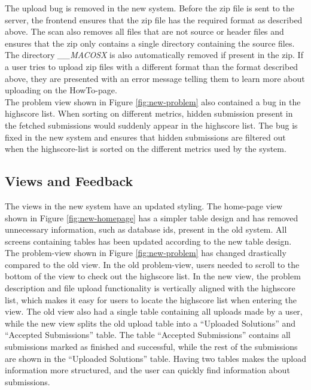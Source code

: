 The upload bug is removed in the new system. Before the zip file is sent to the server, the frontend ensures that the zip file has the required format as described above. The scan also removes all files that are not source or header files and ensures that the zip only contains a single directory containing the source files. The directory \textit{\_\_MACOSX} is also automatically removed if present in the zip. If a user tries to upload zip files with a different format than the format described above, they are presented with an error message telling them to learn more about uploading on the HowTo-page. \\

The problem view shown in Figure \ref{fig:new-problem} also contained a bug in the highscore list. When sorting on different metrics, hidden submission present in the fetched submissions would suddenly appear in the highscore list. The bug is fixed in the new system and ensures that hidden submissions are filtered out when the highscore-list is sorted on the different metrics used by the system.

\subsection{Views and Feedback}
The views in the new system have an updated styling. The home-page view shown in Figure \ref{fig:new-homepage} has a simpler table design and has removed unnecessary information, such as database ids, present in the old system. All screens containing tables has been updated according to the new table design. The problem-view shown in Figure \ref{fig:new-problem} has changed drastically compared to the old view. In the old problem-view, users needed to scroll to the bottom of the view to check out the highscore list. In the new view, the problem description and file upload functionality is vertically aligned with the highscore list, which makes it easy for users to locate the highscore list when entering the view. The old view also had a single table containing all uploads made by a user, while the new view splits the old upload table into a “Uploaded Solutions” and “Accepted Submissions” table. The table “Accepted Submissions” contains all submissions marked as finished and successful, while the rest of the submissions are shown in the “Uploaded Solutions” table. Having two tables makes the upload information more structured, and the user can quickly find information about submissions. \\

